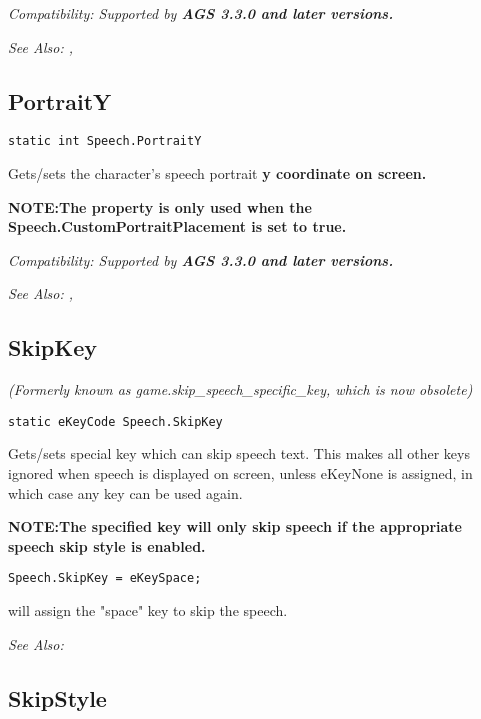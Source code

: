 \it{Compatibility:} Supported by \bf{AGS 3.3.0} and later versions.

\it{See Also:} ,


\subsection{PortraitY}\label{Speech.PortraitY}%

\begin{verbatim}
static int Speech.PortraitY
\end{verbatim}

Gets/sets the character's speech portrait \bf{y} coordinate on screen.

\bf{NOTE:}The property is only used when the \bf{Speech.CustomPortraitPlacement} is set to \bf{true}.

\it{Compatibility:} Supported by \bf{AGS 3.3.0} and later versions.

\it{See Also:} ,


\subsection{SkipKey}\label{Speech.SkipKey}%

\it{(Formerly known as game.skip_speech_specific_key, which is now obsolete)}

\begin{verbatim}
static eKeyCode Speech.SkipKey
\end{verbatim}

Gets/sets special key which can skip speech text. This makes all other keys ignored when speech is displayed on screen, unless eKeyNone is assigned, in which case any key can be used again.

\bf{NOTE:}The specified key will only skip speech if the appropriate speech skip style is enabled.

\begin{verbatim}
Speech.SkipKey = eKeySpace;
\end{verbatim}
will assign the "space" key to skip the speech.

\it{See Also:} 


\subsection{SkipStyle}\label{Speech.SkipStyle}%

